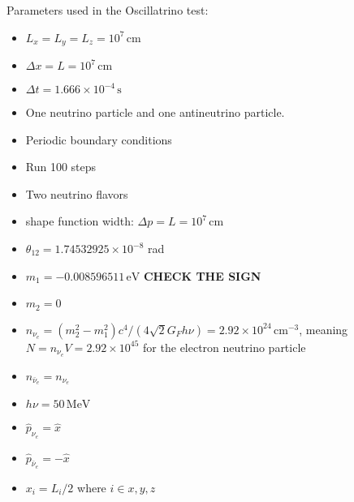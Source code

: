 \documentclass{article}
\begin{document}
Parameters used in the Oscillatrino test:
\begin{itemize}
\item $L_x=L_y=L_z=10^7\,\mathrm{cm}$
\item $\Delta x = L= 10^7\,\mathrm{cm}$
\item $\Delta t = 1.666 \times10^{-4}\,\mathrm{s}$
\item One neutrino particle and one antineutrino particle.
\item Periodic boundary conditions
\item Run 100 steps
\item Two neutrino flavors
\item shape function width: $\Delta p=L=10^7\,\mathrm{cm}$
\item $\theta_{12}= 1.74532925 \times 10^{-8}$ rad 
\item $m_1 = -0.008596511\,\mathrm{eV}$ \textbf{CHECK THE SIGN}
\item $m_2 = 0$
\item $n_{\nu_e}=(m_2^2-m_1^2) c^4/ (4 \sqrt{2} G_F h\nu)=2.92 \times10^{24}\,\mathrm{cm}^{-3}$, meaning $N=n_{\nu_e}V=2.92\times10^{45}$ for the electron neutrino particle
\item $n_{\bar{\nu}_e} = n_{\nu_e}$
\item $h\nu=50\,\mathrm{MeV}$
\item $\hat{p}_{\nu_e} = \hat{x}$
\item $\hat{p}_{\bar{\nu}_e} = -\hat{x}$
\item $x_i = L_i/2$ where $i\in{x,y,z}$
\end{itemize}
\end{document}
